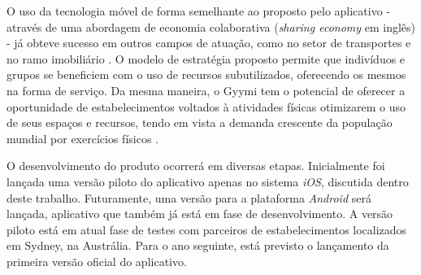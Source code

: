 O uso da tecnologia móvel de forma semelhante ao proposto pelo aplicativo - através de uma abordagem de economia colaborativa (\textit{sharing economy} em inglês) - já obteve sucesso em outros campos de atuação, como no setor de transportes e no ramo imobiliário . O modelo de estratégia proposto permite que indivíduos e grupos se beneficiem com o uso de recursos subutilizados, oferecendo os mesmos na forma de serviço. Da mesma maneira, o Gyymi tem o potencial de oferecer a oportunidade de estabelecimentos voltados à atividades físicas otimizarem o uso de seus espaços e recursos, tendo em vista a demanda crescente da população mundial por exercícios físicos .

O desenvolvimento do produto ocorrerá em diversas etapas. Inicialmente foi lançada uma versão piloto do aplicativo apenas no sistema \textit{iOS}, discutida dentro deste trabalho. Futuramente, uma versão para a plataforma \textit{Android} será lançada, aplicativo que também já está em fase de desenvolvimento. A versão piloto está em atual fase de testes com parceiros de estabelecimentos localizados em Sydney, na Austrália. Para o ano seguinte, está previsto o lançamento da primeira versão oficial do aplicativo.
